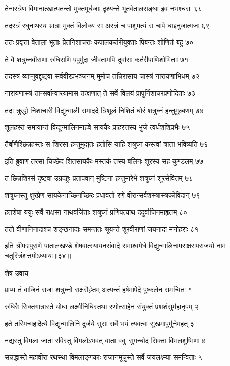 तेनास्त्रेण विमानात्खात्पतन्तो मुक्तमूर्धजाः
दृश्यन्ते भूतवेतालसङ्घा इव नभश्चराः ६८

तदस्त्रं रघुनाथस्य भ्रात्रा मुक्तं विलोक्य सः
अस्त्रं च पाशुपत्यं स चापे धाद्दनुजात्मजः ६९

ततः प्रवृत्ता वेताला भूताः प्रेतनिशाचराः
कपालकर्तरीयुक्ताः पिबन्तः शोणितं बहु ७०

ते वै शत्रुघ्नवीराणां रुधिराणि पपुर्मुदा
जीवतामपि दुर्वाराः कर्तरीपाणिशोभिताः ७१

तदस्त्रं व्याप्नुवद्दृष्ट्वा सर्ववीरप्रभञ्जनम्
मुमोच तन्निरासाय चास्त्रं नारायणाभिधम् ७२

नारायणास्त्रं तान्सर्वान्वारयामास तत्क्षणात्
ते सर्वे विलयं प्रापुर्निशाचरप्रणोदिताः ७३

तदा क्रुद्धो निशाचारी विद्युन्माली समाददे
त्रिशूलं निशितं घोरं शत्रुघ्नं हन्तुमुल्बणम् ७४

शूलहस्तं समायान्तं विद्युन्मालिनमाहवे
सायकैः प्राहरत्तस्य भुजे त्वर्धशशिप्रभैः ७५

तैर्बाणैश्छिन्नहस्तः स शिरसा हन्तुमुद्यतः
हतोसि याहि शत्रुघ्न कस्त्वां त्राता भविष्यति ७६

इति ब्रुवाणं तरसा चिच्छेद शितसायकैः
मस्तकं तस्य बलिनः शूरस्य सह कुण्डलम् ७७

तं छिन्नशिरसं दृष्ट्वा उग्रदंष्ट्रः प्रतापवान्
मुष्टिना हन्तुमारेभे शत्रुघ्नं शूरसेवितम् ७८

शत्रुघ्नस्तु क्षुरप्रेण सायकेनाच्छिनच्छिरः
प्रधावतो रणे वीरान्सर्वशस्त्रास्त्रकोविदान् ७९

हतशेषा ययुः सर्वे राक्षसा नाथवर्जिताः
शत्रुघ्नं प्रणिपत्याथ ददुर्वाजिनमाहृतम् ८०

ततो वीणानिनादाश्च शङ्खनादाः समन्ततः
श्रूयन्ते शूरवीराणां जयनादा मनोहराः ८१

इति श्रीपद्मपुराणे पातालखण्डे शेषवात्स्यायनसंवादे रामाश्वमेधे विद्युन्मालिनामराक्षसपराजयो नाम चतुस्त्रिंशत्तमोऽध्यायः॥३४॥


शेष उवाच

प्राप्य तं वाजिनं राजा शत्रुघ्नो राक्षसैर्हृतम्
अत्यन्तं हर्षमापेदे पुष्कलेन समन्वितः १

रुधिरैः सिक्तगात्रास्ते योधा लक्ष्मीनिधिस्तथा
रणोत्साहेन संयुक्तं प्रशशंसुर्महानृपम् २

हते तस्मिन्महादैत्ये विद्युन्मालिनि दुर्जये
सुराः सर्वे भयं त्यक्त्वा सुखमापुर्मुनेमहत् ३

नद्यस्तु विमला जाता रविस्तु विमलोऽभवत्
वाता ववुः सुगन्धोद सिक्ता विमलशुष्मिणः ४

सन्नद्धास्ते महावीरा रथस्था विमलाङ्गकाः
राजानमूचुस्ते सर्वे जयलक्ष्म्या समन्विताः ५


